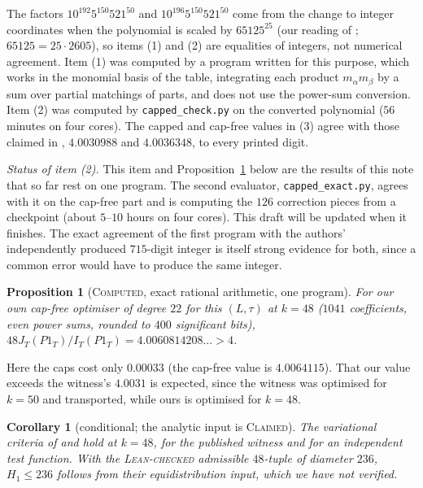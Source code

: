 \documentclass[11pt]{amsart}
\newtheorem{proposition}[theorem]{Proposition}
\newtheorem{corollary}[theorem]{Corollary}
\theoremstyle{definition}
\theoremstyle{remark}
\newcommand{\lbl}[1]{\textup{\textsc{#1}}}
\begin{document}
The factors $10^{192}5^{150}521^{50}$ and $10^{196}5^{150}521^{50}$ come from the
change to integer coordinates when the polynomial is scaled by $65125^{25}$
(our reading of \cite[Eq.~(71)]{SY26}; $65125=25\cdot2605$), so items (1) and
(2) are equalities of integers, not numerical agreement. Item (1) was computed
by a program written for this purpose, which works in the monomial basis of
the table, integrating each product $m_\alpha m_\beta$ by a sum over partial
matchings of parts, and does not use the power-sum conversion. Item (2) was
computed by \texttt{capped\_check.py} on the converted polynomial ($56$ minutes
on four cores). The capped and cap-free values in (3) agree with those claimed
in \cite{Kin26}, $4.0030988$ and $4.0036348$, to every printed digit.

\emph{Status of item (2).} This item and Proposition~\ref{prop:kin-own}
below are the results of this note that so far rest on one program. The second evaluator, \texttt{capped\_exact.py}, agrees
with it on the cap-free part and is computing the $126$ correction pieces
from a checkpoint (about $5$--$10$ hours on four cores). This draft will be
updated when it finishes. The exact agreement of the first program with the
authors' independently produced $715$-digit integer is itself strong evidence
for both, since a common error would have to produce the same integer.

\begin{proposition}[\lbl{Computed}, exact rational arithmetic, one program]\label{prop:kin-own}
For our own cap-free optimiser of degree $22$ for this $(L,\tau)$ at $k=48$
($1041$ coefficients, even power sums, rounded to $400$ significant bits),
$48J_T(P1_T)/I_T(P1_T)=4.0060814208\ldots>4$.
\end{proposition}

Here the caps cost only $0.00033$ (the cap-free value is $4.0064115$). That our
value exceeds the witness's $4.0031$ is expected, since the witness was
optimised for $k=50$ and transported, while ours is optimised for $k=48$.

\begin{corollary}[conditional; the analytic input is \lbl{Claimed}]
The variational criteria of \cite{Kin26} and \cite{SY26} hold at $k=48$, for
the published witness and for an independent test function. With the
\lbl{Lean-checked} admissible $48$-tuple of diameter $236$, $H_1\le236$
follows from their equidistribution input, which we have not verified.
\end{corollary}
\end{document}
